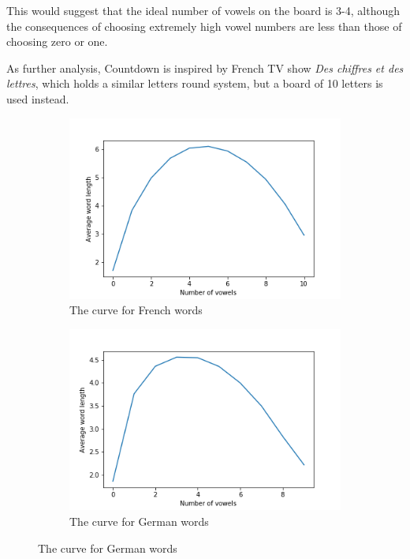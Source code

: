 \documentclass{article}
\begin{document}
This would suggest that the ideal number of vowels on the board is 3-4, although the consequences of choosing extremely high vowel numbers are less than those of choosing zero or one.

As further analysis, Countdown is inspired by French TV show \textit{Des chiffres et des lettres}, which holds a similar letters round system, but a board of 10 letters is used instead. 

\begin{figure}[!h]
  \begin{subfigure}[b]{0.4\textwidth}
    \includegraphics[width=\textwidth]{francais.png}
    \caption{The curve for French words}
    \label{fig:f2}
  \end{subfigure}
  \hfill
  \begin{subfigure}[b]{0.4\textwidth}
    \includegraphics[width=\textwidth]{deutsch.png}
    \caption{The curve for German words}
    \label{fig:f3}
  \end{subfigure}
\end{figure}
\end{document}
